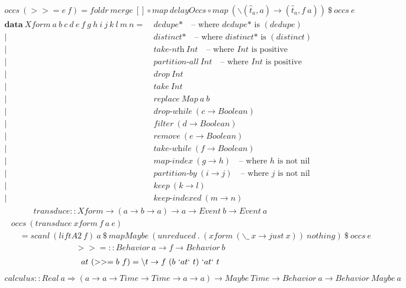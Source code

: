 \documentclass[fleqn]{amsart}
\newcommand{\zeroarity}[1]{&\ \textit{#1*}\quad\text{-- where }\textit{#1*}\text{ is }(#1)}
\newcommand{\positive}[1]{&\ \textit{#1}\ Int\quad\text{-- where }Int\text{ is positive}}
\newcommand{\integer}[1]{&\ #1\ Int}
\newcommand{\predicate}[2]{&\ \textit{#1}\ (#2 \rightarrow Boolean)}
\newcommand{\nonnillable}[3]{&\ \textit{#1}\ (#2 \rightarrow #3)\quad\text{-- where }#3\text{ is not nil}}
\newcommand{\any}[3]{&\ \textit{#1}\ (#2 \rightarrow #3)}
\begin{document}
\begin{align*}
  occs\ (>>= e\ f) = foldr\ merge\ []\circ map\ delayOccs\circ map\ (\backslash(\hat{t}_a, a) \rightarrow (\hat{t}_a , f\ a))\ \$ \ occs\ e
\end{align*}
\begin{align*}
  \mathbf{data}\ Xform\ a\ b\ c\ d\ e\ f\ g\ h\ i\ j\ k\ l\ m\ n =\zeroarity{dedupe}\\
  |\zeroarity{distinct}\\
  |\positive{take-nth}\\
  |\positive{partition-all}\\
  |\integer{drop}\\
  |\integer{take}\\
  |&\ replace\ Map\ a\ b\\
  |\predicate{drop-while}{c}\\
  |\predicate{filter}{d}\\
  |\predicate{remove}{e}\\
  |\predicate{take-while}{f}\\
  |\nonnillable{map-index}{g}{h}\\
  |\nonnillable{partition-by}{i}{j}\\
  |\any{keep}{k}{l}\\
  |\any{keep-indexed}{m}{n}
\end{align*}
\begin{align*}
  transduce :: Xform \rightarrow (a \rightarrow b \rightarrow a) \rightarrow a \rightarrow Event\ b \rightarrow Event\ a
\end{align*}
\begin{align*}
  &occs\ (transduce\ xform\ f\ a\ e)\\
  &\quad= scanl\ (liftA2\ f)\ a\ \$\ mapMaybe\ (unreduced\ .\ (xform\ (\backslash\_\ x\rightarrow just\ x))\ nothing)\ \$\ occs\ e
\end{align*}
\begin{align*}
  >>= :: Behavior\ a \rightarrow f \rightarrow Behavior\ b
\end{align*}
\begin{align*}
  at\ (>>= b\ f) =\backslash t \rightarrow f\ (b\ `at` \ t)\ `at` \ t
\end{align*}
\begin{align*}
  calculus :: Real\ a\Rightarrow (a \rightarrow a \rightarrow Time \rightarrow Time \rightarrow a \rightarrow a) \rightarrow Maybe\ Time \rightarrow Behavior\ a\rightarrow Behavior\ Maybe\ a
\end{align*}
\end{document}

